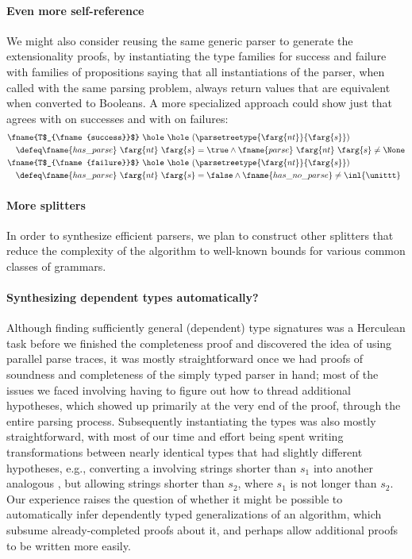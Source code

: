   \paragraph{Even more self-reference}
    We might also consider reusing the same generic parser to generate the extensionality proofs, by instantiating the type families for success and failure with families of propositions saying that all instantiations of the parser, when called with the same parsing problem, always return values that are equivalent when converted to Booleans.  A more specialized approach could show just that  agrees with  on successes and with  on failures:
    \begin{align*}
      &\fname{T$_{\fname{success}}$}~\hole~\hole~(\parsetreetype{\farg{nt}}{\farg{s}}) \\
      & \quad \defeq \fname{has\_parse}~\farg{nt}~\farg{s} = \true \wedge \fname{parse}~\farg{nt}~\farg{s} \neq \None \\
      & \fname{T$_{\fname{failure}}$}~\hole~\hole~(\parsetreetype{\farg{nt}}{\farg{s}}) \\
      & \quad\defeq \fname{has\_parse}~\farg{nt}~\farg{s} = \false\wedge \fname{has\_no\_parse}\neq \inl{\unittt}
    \end{align*}

  \paragraph{More splitters} %
    In order to synthesize efficient parsers, we plan to construct other splitters that reduce the complexity of the algorithm to well-known bounds for various common classes of grammars.

  \paragraph{Synthesizing dependent types automatically?}
    Although finding sufficiently general (dependent) type signatures was a Herculean task before we finished the completeness proof and discovered the idea of using parallel parse traces, it was mostly straightforward once we had proofs of soundness and completeness of the simply typed parser in hand; most of the issues we faced involving having to figure out how to thread additional hypotheses, which showed up primarily at the very end of the proof, through the entire parsing process.  Subsequently instantiating the types was also mostly straightforward, with most of our time and effort being spent writing transformations between nearly identical types that had slightly different hypotheses, e.g., converting a  involving strings shorter than $s_1$ into another analogous , but allowing strings shorter than $s_2$, where $s_1$ is not longer than $s_2$.  Our experience raises the question of whether it might be possible to automatically infer dependently typed generalizations of an algorithm, which subsume already-completed proofs about it, and perhaps allow additional proofs to be written more easily.

